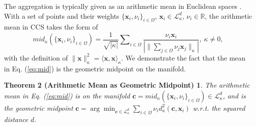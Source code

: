 The aggregation is typically given as an arithmetic mean in Euclidean spaces \cite{www21Lgcn,nips17GraphSAGE}.
With a set of points and their weights $\{\boldsymbol x_i, \nu_i\}_{i \in \Omega}$, $\boldsymbol x_i \in \mathcal L_{\kappa }^{d}$, $\nu_i \in \mathbb R$,
the arithmetic mean in CCS takes the form of 
\begin{equation}
mid_\kappa(\{\boldsymbol x_i, \nu_{i}\}_{i \in \Omega})= 
\frac{1}{\sqrt{|\kappa|} } \sum\nolimits_{i \in \Omega}\frac{\nu_{i} \boldsymbol x_i}{\left| \|\sum\nolimits_{j \in \Omega} \nu_{j} \boldsymbol x_j\|_\kappa \right|}, \ \kappa \neq 0,
\label{eq:mid}
\end{equation}
with the definition of $\|\boldsymbol x\|^2_\kappa=\langle \boldsymbol x, \boldsymbol x \rangle_\kappa$.
We demonstrate the fact that the  mean in Eq. (\ref{eq:mid}) is the geometric midpoint on the manifold.
 \begin{mymath}
\newtheorem*{thm2}{Theorem 2 (Arithmetic Mean as Geometric Midpoint)} 
\begin{thm2}
The arithmetic mean in Eq. (\ref{eq:mid}) is on the manifold $\boldsymbol c=mid_\kappa(\{\boldsymbol x_i, \nu_{i}\}_{i \in \Omega}) \in \mathcal L_{\kappa }^{d}$,
and is the geometric midpoint $\boldsymbol c=\arg \min\nolimits_{\boldsymbol c \in \mathcal L_{\kappa }^{d}} \sum\nolimits_{i \in \Omega} \nu_{i} d^2_\kappa(\boldsymbol c, \boldsymbol x_i)$ w.r.t. the squared distance $d$.
\end{thm2}
\end{mymath}





